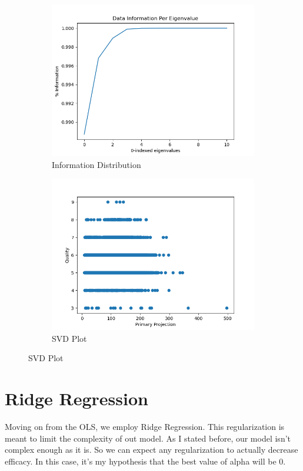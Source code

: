 \documentclass[12pt]{article}
\begin{document}
\begin{figure}
  \begin{subfigure}{.5\textwidth}
  \includegraphics[width=.95\textwidth]{../Information.png}
  \caption{Information Distribution}
  \end{subfigure}%
  \begin{subfigure}{.5\textwidth}
  \includegraphics[width=.95\textwidth]{../SVD_Plot.png}
  \caption{SVD Plot}
  \end{subfigure}
\end{figure}

\section{Ridge Regression}
Moving on from the OLS, we employ Ridge Regression. This regularization is meant to limit the complexity of out model. 
As I stated before, our model isn't complex enough as it is. So we can expect any regularization to actually decrease 
efficacy. In this case, it's my hypothesis that the best value of alpha will be 0.
\end{document}
